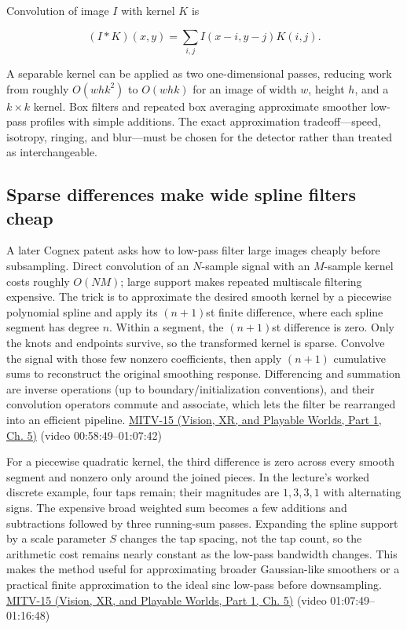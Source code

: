 Convolution of image \(I\) with kernel \(K\) is

\[
(I*K)(x,y)=\sum_{i,j}I(x-i,y-j)K(i,j).
\]

A separable kernel can be applied as two one-dimensional passes, reducing work from roughly \(O(whk^2)\) to \(O(whk)\) for an image of width \(w\), height \(h\), and a \(k\times k\) kernel. Box filters and repeated box averaging approximate smoother low-pass profiles with simple additions. The exact approximation tradeoff---speed, isotropy, ringing, and blur---must be chosen for the detector rather than treated as interchangeable.

\subsection{Sparse differences make wide spline filters cheap}\label{03-visual-computing-i-ch004-sparse-differences-make-wide-spline-filters-cheap}

\hypertarget{03-visual-computing-i-ch004-sparse-differences-make-wide-spline-filters-cheap}{}

A later Cognex patent asks how to low-pass filter large images cheaply before subsampling. Direct convolution of an \(N\)-sample signal with an \(M\)-sample kernel costs roughly \(O(NM)\); large support makes repeated multiscale filtering expensive. The trick is to approximate the desired smooth kernel by a piecewise polynomial spline and apply its \((n+1)\)st finite difference, where each spline segment has degree \(n\). Within a segment, the \((n+1)\)st difference is zero. Only the knots and endpoints survive, so the transformed kernel is sparse. Convolve the signal with those few nonzero coefficients, then apply \((n+1)\) cumulative sums to reconstruct the original smoothing response. Differencing and summation are inverse operations (up to boundary/initialization conventions), and their convolution operators commute and associate, which lets the filter be rearranged into an efficient pipeline. \href{../07-Vision-XR-and-Playable-Worlds-P01/main.pdf\#nameddest=04-visual-computing-ii-ch036-mitv-15---alignment-patmax-distance-field-filtering-and-sub-sampling-us-7065262}{MITV-15 (Vision, XR, and Playable Worlds, Part 1, Ch. 5)} (video 00:58:49--01:07:42)

For a piecewise quadratic kernel, the third difference is zero across every smooth segment and nonzero only around the joined pieces. In the lecture's worked discrete example, four taps remain; their magnitudes are \(1,3,3,1\) with alternating signs. The expensive broad weighted sum becomes a few additions and subtractions followed by three running-sum passes. Expanding the spline support by a scale parameter \(S\) changes the tap spacing, not the tap count, so the arithmetic cost remains nearly constant as the low-pass bandwidth changes. This makes the method useful for approximating broader Gaussian-like smoothers or a practical finite approximation to the ideal sinc low-pass before downsampling. \href{../07-Vision-XR-and-Playable-Worlds-P01/main.pdf\#nameddest=04-visual-computing-ii-ch036-mitv-15---alignment-patmax-distance-field-filtering-and-sub-sampling-us-7065262}{MITV-15 (Vision, XR, and Playable Worlds, Part 1, Ch. 5)} (video 01:07:49--01:16:48)

